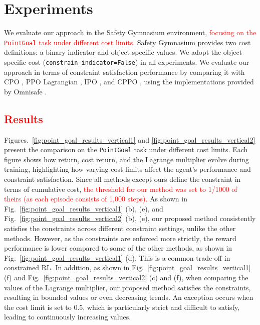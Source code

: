 \section{Experiments}

We evaluate our approach in the Safety Gymnasium \cite{ji2023safety} environment, \textcolor{red}{focusing on the \texttt{PointGoal} task under different cost limits.}
Safety Gymnasium provides two cost definitions: a binary indicator and object-specific values. 
We adopt the object-specific cost (\texttt{constrain\_indicator=False}) in all experiments.
We evaluate our approach in terms of constraint satisfaction performance by comparing it with CPO \cite{achiam2017constrained}, PPO Lagrangian \cite{ray2019benchmarking}, IPO \cite{liu2020ipo}, and CPPO \cite{stooke2020responsive}, using the implementations provided by Omnisafe \cite{ji2024omnisafe}.

\subsection{\textcolor{red}{Results}}

Figures.~\ref{fig:point_goal_results_vertical1} and \ref{fig:point_goal_results_vertical2} present the comparison on the \texttt{PointGoal} task under different cost limits.
Each figure shows how return, cost return, and the Lagrange multiplier evolve during training, highlighting how varying cost limits affect the agent's performance and constraint satisfaction.
Since all methods except ours define the constraint in terms of cumulative cost, \textcolor{red}{the threshold for our method was set to 1/1000 of theirs (as each episode consists of 1,000 steps).}
As shown in Fig.~\ref{fig:point_goal_results_vertical1} (b), (e), and Fig.~\ref{fig:point_goal_results_vertical2} (b), (e), our proposed method consistently satisfies the constraints across different constraint settings, unlike the other methods.
However, as the constraints are enforced more strictly, the reward performance is lower compared to some of the other methods, as shown in Fig.~\ref{fig:point_goal_results_vertical1} (d).
This is a common trade-off in constrained RL.
In addition, as shown in Fig.~\ref{fig:point_goal_results_vertical1} (f) and Fig.~\ref{fig:point_goal_results_vertical2} (c) and (f), when comparing the values of the Lagrange multiplier, our proposed method satisfies the constraints, resulting in bounded values or even decreasing trends.
An exception occurs when the cost limit is set to 0.5, which is particularly strict and difficult to satisfy, leading to continuously increasing values.

